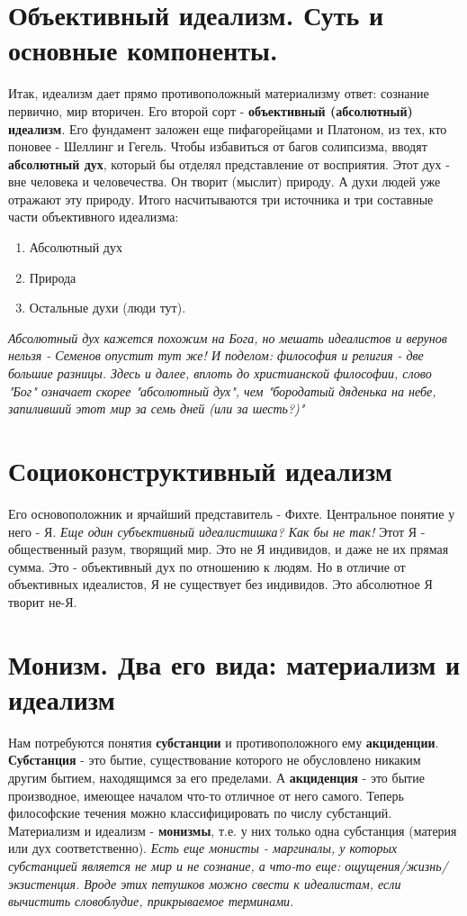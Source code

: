 \section{Объективный идеализм. Суть и основные компоненты.}
Итак, идеализм дает прямо противоположный материализму ответ: сознание первично, мир вторичен. Его второй сорт - \textbf{объективный (абсолютный) идеализм}. Его фундамент заложен еще пифагорейцами и Платоном, из тех, кто поновее - Шеллинг и Гегель. Чтобы избавиться от багов солипсизма, вводят \textbf{абсолютный дух}, который бы отделял представление от восприятия. Этот дух - вне человека и человечества. Он творит (мыслит) природу. А духи людей уже отражают эту природу. Итого насчитываются три источника и три составные части объективного идеализма:
\begin{enumerate}
\item Абсолютный дух
\item Природа
\item Остальные духи (люди тут).
\end{enumerate}
\textit{Абсолютный дух кажется похожим на Бога, но мешать идеалистов и верунов нельзя - Семенов опустит тут же! И поделом: философия и религия - две большие разницы. Здесь и далее, вплоть до христианской философии, слово "Бог" означает скорее "абсолютный дух", чем "бородатый дяденька на небе, запиливший этот мир за семь дней (или за шесть?)"}

\section{Социоконструктивный идеализм}
Его основоположник и ярчайший представитель - Фихте. Центральное понятие у него - Я. \textit{Еще один субъективный идеалистишка? Как бы не так!} Этот Я - общественный разум, творящий мир. Это не Я индивидов, и даже не их прямая сумма. Это - объективный дух по отношению к людям. Но в отличие от объективных идеалистов, Я не существует без индивидов. Это абсолютное Я творит не-Я.

\section{Монизм. Два его вида: материализм и идеализм}
Нам потребуются понятия \textbf{субстанции} и противоположного ему \textbf{акциденции}. 
\textbf{Субстанция} - это бытие, существование которого не обусловлено никаким другим бытием,
находящимся за его пределами.
А \textbf{акциденция} - это бытие производное, имеющее началом
что-то отличное от него самого. Теперь философские течения можно классифицировать по числу субстанций. Материализм и идеализм - \textbf{монизмы}, т.е. у них только одна субстанция (материя или дух соответственно). \textit{Есть еще монисты - маргиналы, у которых субстанцией является не мир и не сознание, а что-то еще: ощущения/жизнь/экзистенция. Вроде этих петушков можно свести к идеалистам, если вычистить словоблудие, прикрываемое терминами.}

